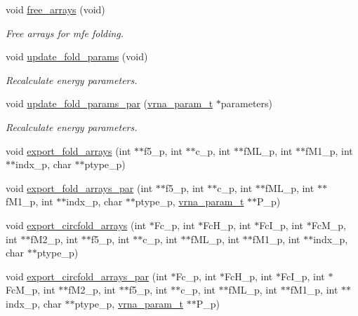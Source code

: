 \begin{DoxyCompactItemize}
void \hyperlink{group__mfe__fold__single_ga107fdfe5fd641868156bfd849f6866c7}{free\-\_\-arrays} (void)
\begin{DoxyCompactList}\small\item\em Free arrays for mfe folding. \end{DoxyCompactList}\item 
void \hyperlink{group__mfe__fold__single_ga41bf8f6fa15b94471f7095cad9f0ccf3}{update\-\_\-fold\-\_\-params} (void)
\begin{DoxyCompactList}\small\item\em Recalculate energy parameters. \end{DoxyCompactList}\item 
void \hyperlink{group__mfe__fold__single_gae66dc422efb8f5d56717d92d6002a9f8}{update\-\_\-fold\-\_\-params\-\_\-par} (\hyperlink{group__energy__parameters_ga8a69ca7d787e4fd6079914f5343a1f35}{vrna\-\_\-param\-\_\-t} $\ast$parameters)
\begin{DoxyCompactList}\small\item\em Recalculate energy parameters. \end{DoxyCompactList}\item 
void \hyperlink{group__mfe__fold__single_ga99641b8dbb40891da5490d3cc271e607}{export\-\_\-fold\-\_\-arrays} (int $\ast$$\ast$f5\-\_\-p, int $\ast$$\ast$c\-\_\-p, int $\ast$$\ast$f\-M\-L\-\_\-p, int $\ast$$\ast$f\-M1\-\_\-p, int $\ast$$\ast$indx\-\_\-p, char $\ast$$\ast$ptype\-\_\-p)
\item 
void \hyperlink{group__mfe__fold__single_ga6606ec0ec964ea506fdadb997a1a5328}{export\-\_\-fold\-\_\-arrays\-\_\-par} (int $\ast$$\ast$f5\-\_\-p, int $\ast$$\ast$c\-\_\-p, int $\ast$$\ast$f\-M\-L\-\_\-p, int $\ast$$\ast$f\-M1\-\_\-p, int $\ast$$\ast$indx\-\_\-p, char $\ast$$\ast$ptype\-\_\-p, \hyperlink{group__energy__parameters_ga8a69ca7d787e4fd6079914f5343a1f35}{vrna\-\_\-param\-\_\-t} $\ast$$\ast$P\-\_\-p)
\item 
void \hyperlink{group__mfe__fold__single_ga04d5d639fd4473ca766436a9bae5665c}{export\-\_\-circfold\-\_\-arrays} (int $\ast$Fc\-\_\-p, int $\ast$Fc\-H\-\_\-p, int $\ast$Fc\-I\-\_\-p, int $\ast$Fc\-M\-\_\-p, int $\ast$$\ast$f\-M2\-\_\-p, int $\ast$$\ast$f5\-\_\-p, int $\ast$$\ast$c\-\_\-p, int $\ast$$\ast$f\-M\-L\-\_\-p, int $\ast$$\ast$f\-M1\-\_\-p, int $\ast$$\ast$indx\-\_\-p, char $\ast$$\ast$ptype\-\_\-p)
\item 
void \hyperlink{group__mfe__fold__single_ga004bb901e7fd2f8d5ae68f9530318ce1}{export\-\_\-circfold\-\_\-arrays\-\_\-par} (int $\ast$Fc\-\_\-p, int $\ast$Fc\-H\-\_\-p, int $\ast$Fc\-I\-\_\-p, int $\ast$Fc\-M\-\_\-p, int $\ast$$\ast$f\-M2\-\_\-p, int $\ast$$\ast$f5\-\_\-p, int $\ast$$\ast$c\-\_\-p, int $\ast$$\ast$f\-M\-L\-\_\-p, int $\ast$$\ast$f\-M1\-\_\-p, int $\ast$$\ast$indx\-\_\-p, char $\ast$$\ast$ptype\-\_\-p, \hyperlink{group__energy__parameters_ga8a69ca7d787e4fd6079914f5343a1f35}{vrna\-\_\-param\-\_\-t} $\ast$$\ast$P\-\_\-p)

\end{DoxyCompactItemize}
